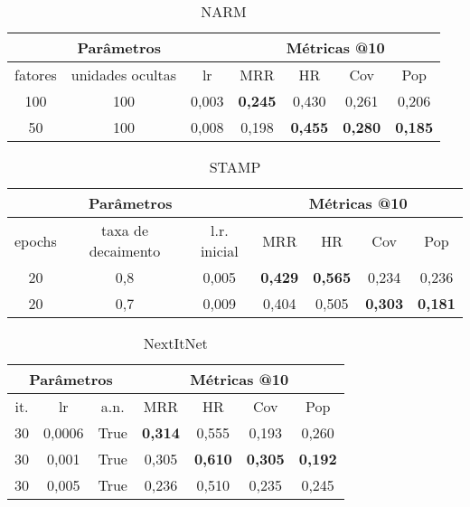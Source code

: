 \begin{table}[htbp]
  \centering
  \begin{tabular}{|c|c|c|c|c|c|c|}
    \hline
      \multicolumn{3}{|c|}{Parâmetros} & \multicolumn{4}{c|}{Métricas @10} \\
      \hline
      fatores & unidades ocultas & lr & MRR & HR & Cov & Pop \\
      \hline
      100 & 100 & 0,003 & \textbf{0,245} & 0,430 & 0,261 & 0,206 \\
      \hline
      50 & 100 & 0,008 & 0,198 & \textbf{0,455} & \textbf{0,280} & \textbf{0,185} \\
      \hline
\end{tabular}
      \caption{NARM}
      \label{opt:NARM_last}
\end{table}

\begin{table}[htbp]
  \centering
  \begin{tabular}{|c|c|c|c|c|c|c|}
    \hline
      \multicolumn{3}{|c|}{Parâmetros} & \multicolumn{4}{c|}{Métricas @10} \\
      \hline
      epochs & taxa de decaimento & l.r. inicial & MRR & HR & Cov & Pop \\
      \hline
      20 & 0,8 & 0,005 & \textbf{0,429} & \textbf{0,565} & 0,234 & 0,236 \\
      \hline
      20 & 0,7 & 0,009 & 0,404 & 0,505 & \textbf{0,303} & \textbf{0,181} \\
      \hline
\end{tabular}
      \caption{STAMP}
      \label{opt:stamp_last}
\end{table}

\begin{table}[htbp]
  \centering
  \begin{tabular}{|c|c|c|c|c|c|c|}
    \hline
      \multicolumn{3}{|c|}{Parâmetros} & \multicolumn{4}{c|}{Métricas @10} \\
      \hline
      it. & lr & a.n. & MRR & HR & Cov & Pop \\
      \hline
      30 & 0,0006 & True & \textbf{0,314} & 0,555 & 0,193 & 0,260 \\
      \hline
      30 & 0,001 & True & 0,305 & \textbf{0,610} & \textbf{0,305} & \textbf{0,192} \\
      \hline
      30 & 0,005 & True & 0,236 & 0,510 & 0,235 & 0,245 \\
      \hline
\end{tabular}
      \caption{NextItNet}
      \label{opt:NextItNet_last}
\end{table}

